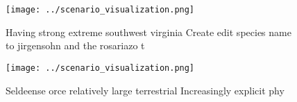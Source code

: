 \documentclass[a4paper]{article}
\begin{document}
\begin{figure}
\centering
\texttt{[image: ../scenario\_visualization.png]}
\caption{Having strong extreme southwest virginia Create edit species name to jirgensohn and the rosariazo t
}
\end{figure}
 
\begin{figure}
\centering
\texttt{[image: ../scenario\_visualization.png]}
\caption{Seldeense orce relatively large terrestrial Increasingly explicit phy
}
\end{figure}
 
\end{document}

